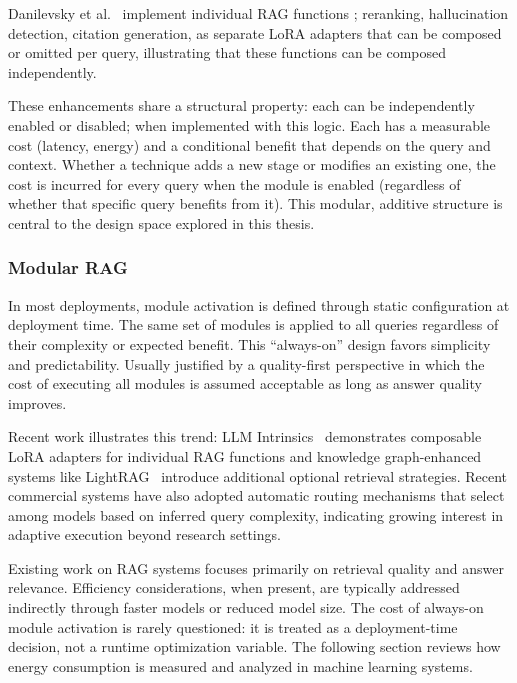 Danilevsky et al.~\cite{llmintrinsics2025} implement individual RAG functions ; reranking, 
hallucination detection, citation generation, as separate LoRA adapters that can be composed or omitted per 
query, illustrating that these functions can be composed independently.

\medskip

These enhancements share a structural property: each can be independently enabled or disabled; when implemented
with this logic. Each has a measurable cost (latency, energy) and a conditional
benefit that depends on the query and context. 
Whether a technique adds a new stage or modifies an existing one, the cost is incurred for every query when 
the module is enabled (regardless of whether that specific query benefits from it). This modular, additive 
structure is central to the design space explored in this thesis.



\subsubsection{Modular RAG}

In most deployments, module activation is defined through static configuration
at deployment time. The same set of modules is applied to all queries regardless
of their complexity or expected benefit. 
This ``always-on'' design favors simplicity and predictability. 
Usually justified by a quality-first perspective in which the cost 
of executing all modules is assumed acceptable as long as answer quality improves.

Recent work illustrates this trend: LLM Intrinsics~\cite{llmintrinsics2025} demonstrates 
composable LoRA adapters for individual RAG functions and knowledge graph-enhanced 
systems like LightRAG~\cite{lightrag2025} introduce additional optional retrieval 
strategies. Recent commercial systems have also adopted automatic routing mechanisms
that select among models based on inferred query complexity, indicating growing
interest in adaptive execution beyond research settings.

Existing work on RAG systems focuses primarily on retrieval quality and answer 
relevance. Efficiency considerations, when present, are typically addressed indirectly 
through faster models or reduced model size. The cost of always-on module activation 
is rarely questioned: it is treated as a deployment-time decision, not a runtime 
optimization variable. The following section reviews how energy consumption is 
measured and analyzed in machine learning systems.



